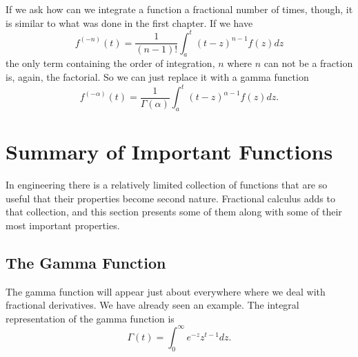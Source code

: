 If we ask how can we integrate a function a fractional number of times, though, it is similar to what was done in the first chapter. If we have
\begin{equation*}
  f^{(-n)}(t) = \frac{1}{\left( n - 1 \right)!} \int_a^t \left( t - z \right)^{n-1} f(z) dz
\end{equation*}
the only term containing the order of integration, $n$ where $n$ can not be a fraction is, again, the factorial. So we can just replace it with a gamma function 
\begin{equation}
  \boxed{ f^{(-\alpha)}(t) = \frac{1}{\Gamma \left( \alpha \right)} \int_a^t \left( t - z \right)^{\alpha-1} f(z) dz. }
  \label{eq:fracint}
\end{equation}

\section{Summary of Important Functions}

In engineering there is a relatively limited collection of functions that are so useful that their properties become second nature. Fractional calculus adds to that collection, and this section presents some of them along with some of their most important properties.

\subsection{The Gamma Function}
The gamma function will appear just about everywhere where we deal with fractional derivatives. We have already seen an example. The integral representation of the gamma function is
\begin{equation}
  \boxed{ \Gamma(t) = \int_0^\infty e^{-z} z^{t-1} dz. }
  \label{eq:gammadef}
\end{equation}

